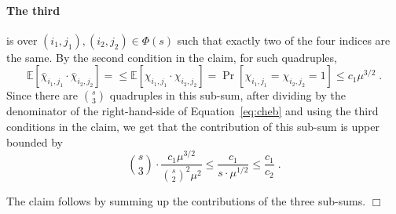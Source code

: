 \documentclass{article}
\newcommand{\Ex}{\mathbb{E}}
\newenvironment{proof}{\smallskip\noindent{\bf Proof:}}%
        {\hspace*{\fill}$\Box$\par}
\begin{document}
\begin{proof}
\paragraph{The third} is over $(i_1,j_1), (i_2,j_2) \in \Phi(s)$ such that exactly two of the four indices are the same. By the second condition in the claim, for such quadruples,
\begin{equation}\label{eq:cheb-case3}
\Ex[\bar{\chi}_{i_1,j_1}\cdot \bar{\chi}_{i_2,j_2}]  =
\leq \Ex[\chi_{i_1,j_1}\cdot \chi_{i_2,j_2}] = \Pr[\chi_{i_1,j_1}=\chi_{i_2,j_2}=1] \leq c_1\mu^{3/2}\;.
\end{equation}
Since there are  ${s\choose 3}$ quadruples in this sub-sum, after dividing by the denominator of the right-hand-side of Equation~\eqref{eq:cheb} and using the  third conditions in the claim, we get that the contribution of this sub-sum is upper bounded by
\begin{equation}
{s\choose 3} \cdot \frac{c_1\mu^{3/2}}{{s\choose 2}^2 \mu^2} \leq \frac{c_1}{s\cdot \mu^{1/2}}\leq \frac{c_1}{c_2}\;.
\end{equation}

The claim follows by summing up the contributions of the three sub-sums.
\end{proof}
\fi
\end{document}
